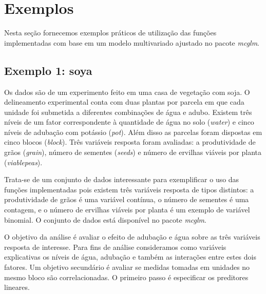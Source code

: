 
\section{Exemplos}

Nesta seção fornecemos exemplos práticos de utilização das funções implementadas com base em um modelo multivariado ajustado no pacote \emph{mcglm}.

\subsection{Exemplo 1: soya}

Os dados são de um experimento feito em uma casa de vegetação com soja. O delineamento experimental conta com duas plantas por parcela em que cada unidade foi submetida a diferentes combinações de água e adubo. Existem três níveis de um fator correspondente à quantidade de água no solo (\emph{water}) e cinco níveis de adubação com potássio (\emph{pot}). Além disso as parcelas foram dispostas em cinco blocos (\emph{block}). Três variáveis resposta foram avaliadas: a produtividade de grãos (\emph{grain}), número de sementes (\emph{seeds}) e número de ervilhas viáveis por planta (\emph{viablepeas}).

Trata-se de um conjunto de dados interessante para exemplificar o uso das funções implementadas pois existem três variáveis resposta de tipos distintos: a produtividade de grãos é uma variável contínua, o número de sementes é uma contagem, e o número de ervilhas viáveis por planta é um exemplo de variável binomial. O conjunto de dados está disponível no pacote \emph{mcglm}.

\begin{knitrout}
\color{fgcolor}\begin{kframe}
\begin{alltt}
\hlstd{(}\hlstd{,}  \hlstd{=} \hlstd{)}
\end{alltt}
\end{kframe}
\end{knitrout}

O objetivo da análise é avaliar o efeito de adubação e água sobre as três variáveis resposta de interesse. Para fins de análise consideramos como variáveis explicativas os níveis de água, adubação e também as interações entre estes dois fatores. Um objetivo secundário é avaliar se medidas tomadas em unidades no mesmo bloco são correlacionadas. O primeiro passo é especificar os preditores lineares.

